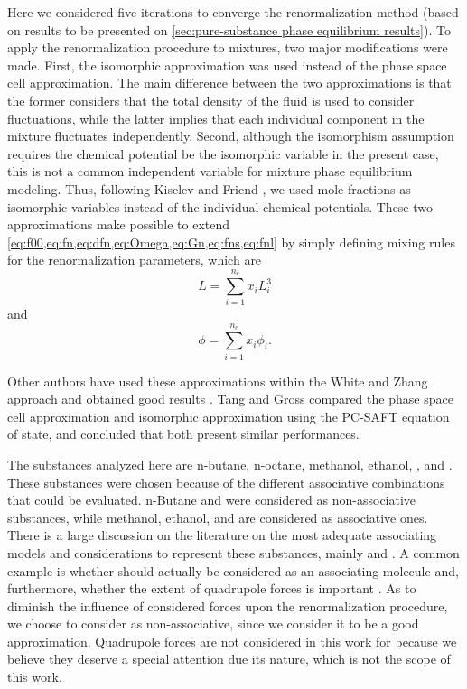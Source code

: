 \documentclass[preprint,12pt,3p]{elsarticle}
\begin{document}
Here we considered five iterations to converge the renormalization method (based on results to be presented on \cref{sec:pure-substance phase equilibrium results}).
To apply the renormalization procedure to mixtures, two major modifications were made.
First, the isomorphic approximation \citep{fisher1968renormalization} was used instead of the phase space cell approximation.
The main difference between the two approximations is that the former considers that the total density of the fluid is used to consider fluctuations, while the latter implies that each individual component in the mixture fluctuates independently.
Second, although the isomorphism assumption requires the chemical potential be the isomorphic variable in the present case, this is not a common independent variable for mixture phase equilibrium modeling.
Thus, following Kiselev and Friend \citep{kiselev1999cubic}, we used mole fractions as isomorphic variables instead of the individual chemical potentials.
These two approximations make possible to extend \cref{eq:f00,eq:fn,eq:dfn,eq:Omega,eq:Gn,eq:fns,eq:fnl} by simply defining mixing rules for the renormalization parameters, which are
\begin{equation} \label{eq:mix_L}
L = \sum_{i=1}^{n_c}x_{i}L_{i}^{3}
\end{equation}
and
\begin{equation} \label{eq:mix_phi}
\phi = \sum_{i=1}^{n_c}x_{i}\phi_{i}.
\end{equation}

Other authors have used these approximations within the White and Zhang approach \cite{white1993renormalization} and obtained good results \cite{cai2004thermodynamics, llovell2006global, sun2005application, pcm2017application, xu2011prediction}.
Tang and Gross \citep{tang2010renormalization} compared the phase space cell approximation and isomorphic approximation using the PC-SAFT equation of state, and concluded that both present similar performances.

The substances analyzed here are n-butane, n-octane, methanol, ethanol, , and .
These substances were chosen because of the different associative combinations that could be evaluated.
n-Butane and  were considered as non-associative substances, while methanol, ethanol, and  are considered as associative ones.
There is a large discussion on the literature on the most adequate associating models and considerations to represent these substances, mainly  \citep{bjorner2016modeling} and  \citep{ruffine2006represent}.
A common example is whether  should actually be considered as an associating molecule and, furthermore, whether the extent of quadrupole forces is important \cite{tsivintzelis2011modeling,bjorner2016modeling}.
As to diminish the influence of considered forces upon the renormalization procedure, we choose to consider  as non-associative, since we consider it to be a good approximation.
Quadrupole forces are not considered in this work for  because we believe they deserve a special attention due its nature, which is not the scope of this work.
\end{document}
